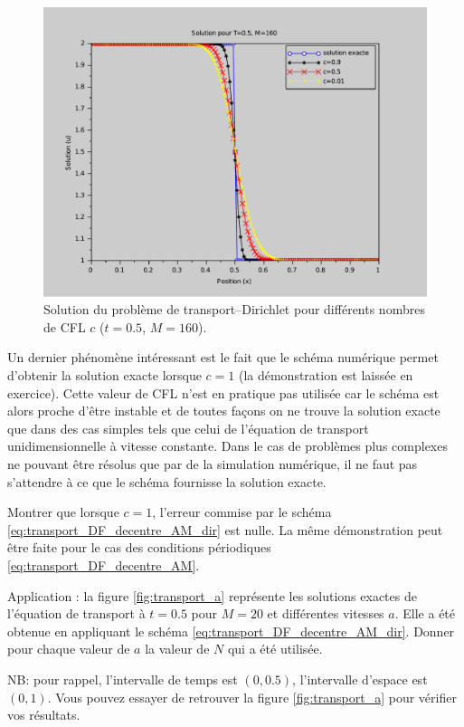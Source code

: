 \documentclass[12pt,a4paper,twoside]{article}
\begin{document}
\begin{figure}[h]
  \centering
  \includegraphics[width = 12cm]{Figures/transport_Dir_CFL.pdf}
  \caption{Solution du probl\`eme de transport--Dirichlet pour diff\'erents nombres de CFL $c$
    ($t=0.5$, $M=160$).}
  \label{fig:trans_CFL}
\end{figure}

Un dernier ph\'enom\`ene int\'eressant est le fait que le sch\'ema num\'erique permet
d'obtenir la solution exacte lorsque $c=1$ (la d\'emonstration est laiss\'ee en exercice).
Cette valeur de CFL n'est en pratique pas utilis\'ee car le sch\'ema est alors proche d'\^etre
instable et de toutes fa\c{c}ons on ne trouve la solution exacte que dans des cas simples
tels que celui de l'\'equation de transport unidimensionnelle \`a vitesse constante.
Dans le cas de probl\`emes plus complexes ne pouvant \^etre r\'esolus que par de la simulation
num\'erique, il ne faut pas s'attendre \`a ce que le sch\'ema fournisse la solution exacte.

\begin{exercise}
  Montrer que lorsque $c=1$, l'erreur commise par le sch\'ema 
  \eqref{eq:transport_DF_decentre_AM_dir} est nulle.
  La m\^eme d\'emonstration peut \^etre faite pour le cas des conditions p\'eriodiques
  \eqref{eq:transport_DF_decentre_AM}.

  Application : 
  la figure \ref{fig:transport_a} repr\'esente les solutions exactes de l'\'equation de transport
  \`a $t=0.5$ pour $M=20$ et diff\'erentes vitesses $a$.
  Elle a \'et\'e obtenue en appliquant le sch\'ema 
  \eqref{eq:transport_DF_decentre_AM_dir}. Donner pour chaque valeur de $a$ la valeur de $N$
  qui a \'et\'e utilis\'ee.

  NB: pour rappel, l'intervalle de temps est $(0,0.5)$, l'intervalle d'espace est $(0,1)$.
  Vous pouvez essayer de retrouver la figure \ref{fig:transport_a}
  pour v\'erifier vos r\'esultats.
\end{exercise}
\end{document}
